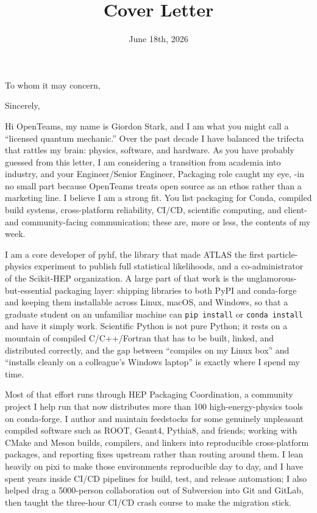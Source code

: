 \documentclass[10pt,letterpaper,sans]{moderncv} %
\title{Cover Letter}
\begin{document}
\date{June 18th, 2026}
\opening{To whom it may concern,}
\closing{Sincerely,}

\makelettertitle
\vspace*{-1em}

Hi OpenTeams, my name is Giordon Stark, and I am what you might call a ``licensed quantum mechanic.'' Over the past decade I have balanced the trifecta that rattles my brain: physics, software, and hardware. As you have probably guessed from this letter, I am considering a transition from academia into industry, and your Engineer/Senior Engineer, Packaging role caught my eye, -in no small part because OpenTeams treats open source as an ethos rather than a marketing line. I believe I am a strong fit. You list packaging for Conda, compiled build systems, cross-platform reliability, CI/CD, scientific computing, and client- and community-facing communication; these are, more or less, the contents of my week.

I am a core developer of pyhf, the library that made ATLAS the first particle-physics experiment to publish full statistical likelihoods, and a co-administrator of the Scikit-HEP organization. A large part of that work is the unglamorous-but-essential packaging layer: shipping libraries to both PyPI and conda-forge and keeping them installable across Linux, macOS, and Windows, so that a graduate student on an unfamiliar machine can \texttt{pip install} or \texttt{conda install} and have it simply work. Scientific Python is not pure Python; it rests on a mountain of compiled C/C++/Fortran that has to be built, linked, and distributed correctly, and the gap between ``compiles on my Linux box'' and ``installs cleanly on a colleague's Windows laptop'' is exactly where I spend my time.

Most of that effort runs through HEP Packaging Coordination, a community project I help run that now distributes more than 100 high-energy-physics tools on conda-forge. I author and maintain feedstocks for some genuinely unpleasant compiled software such as ROOT, Geant4, Pythia8, and friends; working with CMake and Meson builds, compilers, and linkers into reproducible cross-platform packages, and reporting fixes upstream rather than routing around them. I lean heavily on pixi to make those environments reproducible day to day, and I have spent years inside CI/CD pipelines for build, test, and release automation; I also helped drag a 5000-person collaboration out of Subversion into Git and GitLab, then taught the three-hour CI/CD crash course to make the migration stick.
\end{document}
